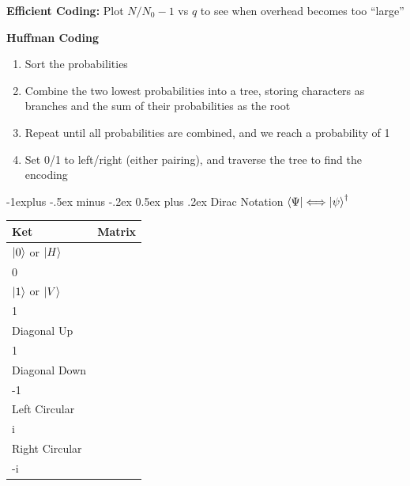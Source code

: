 \documentclass[letterpaper, 8pt]{extarticle}
\makeatletter
\renewcommand{\section}{\@startsection{section}{1}{0mm}%
                                {-1explus -.5ex minus -.2ex}%
                                {0.5ex plus .2ex}%
                                {\normalfont\normalsize\bfseries}}
\makeatother
\begin{document}
\begin{multicols*}{5}
    \textbf{Efficient Coding:}
    Plot \(N/N_0 - 1\) vs \(q\) to see when overhead becomes too ``large''

    \textbf{Huffman Coding}
    \begin{enumerate}
        \item Sort the probabilities
        \item Combine the two lowest probabilities into a tree,
              storing characters as branches and the sum of their probabilities as the root
        \item Repeat until all probabilities are combined, and we reach a probability of 1
        \item Set 0/1 to left/right (either pairing), and traverse the tree to find the encoding
    \end{enumerate}

    \section{Dirac Notation}
    \(\bra{\Psi} \Longleftrightarrow \ket{\psi}^\dagger\)

    \begin{tabular}{@{}lc@{}}\toprule
        Ket                        & Matrix                                                      \\ \midrule
        \(\ket{0}\) or \(\ket{H}\) & \(\begin{bmatrix} 1 \\ 0 \end{bmatrix}\)                    \\
        \(\ket{1}\) or \(\ket{V}\) & \(\begin{bmatrix} 0 \\ 1 \end{bmatrix}\)                    \\
        Diagonal Up                & \(\frac{1}{\sqrt{2}}\begin{bmatrix} 1 \\ 1 \end{bmatrix}\)  \\
        Diagonal Down              & \(\frac{1}{\sqrt{2}}\begin{bmatrix} 1 \\ -1 \end{bmatrix}\) \\
        Left Circular              & \(\frac{1}{\sqrt{2}}\begin{bmatrix} 1 \\ i \end{bmatrix}\)  \\
        Right Circular             & \(\frac{1}{\sqrt{2}}\begin{bmatrix} 1 \\ -i \end{bmatrix}\) \\
        \bottomrule
    \end{tabular}


\end{multicols*}
\end{document}
